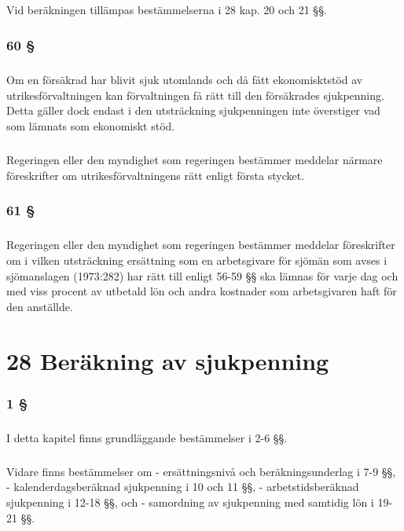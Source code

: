 \documentclass[a4paper,notitlepage,openany,10pt]{book}
\begin{document}
\paragraph*{}
Vid beräkningen tillämpas bestämmelserna i 28 kap. 20 och 21 §§.
\subsection*{60 §}
\paragraph*{}
Om en försäkrad har blivit sjuk utomlands och då fått ekonomisktstöd av utrikesförvaltningen kan förvaltningen få rätt till den försäkrades sjukpenning. Detta gäller dock endast i den utsträckning sjukpenningen inte överstiger vad som lämnats som ekonomiskt stöd.
\paragraph*{}
Regeringen eller den myndighet som regeringen bestämmer meddelar närmare föreskrifter om utrikesförvaltningens rätt enligt första stycket.
\subsection*{61 §}
\paragraph*{}
Regeringen eller den myndighet som regeringen bestämmer meddelar föreskrifter om i vilken utsträckning ersättning som en arbetsgivare för sjömän som avses i sjömanslagen (1973:282) har rätt till enligt 56-59 §§ ska lämnas för varje dag och med viss procent av utbetald lön och andra kostnader som arbetsgivaren haft för den anställde.
\chapter*{28 Beräkning av sjukpenning}
\subsection*{1 §}
\paragraph*{}
I detta kapitel finns grundläggande bestämmelser i 2-6 §§.
\paragraph*{}
Vidare finns bestämmelser om
\newline - ersättningsnivå och beräkningsunderlag i 7-9 §§,
\newline - kalenderdagsberäknad sjukpenning i 10 och 11 §§,
\newline - arbetstidsberäknad sjukpenning i 12-18 §§, och
\newline - samordning av sjukpenning med samtidig lön i 19-21 §§.
\end{document}
